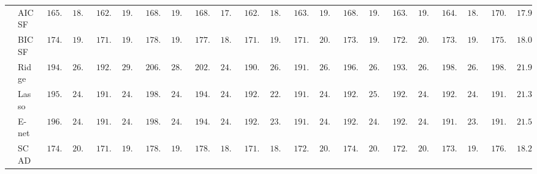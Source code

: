 \begin{tabular}{ll|ll|llllll|llllll|llllll}
 & AIC SF  & $\phantom{0}165.21$ & $\phantom{0}18.66$ & $\phantom{0}162.78$ & $\phantom{0}19.10$ & $\phantom{0}168.74$ & $\phantom{0}19.47$ & $\phantom{0}168.38$ & $\phantom{0}17.49$ & $\phantom{0}162.47$ & $\phantom{0}18.12$ & $\phantom{0}163.61$ & $\phantom{0}19.58$ & $\phantom{0}168.05$ & $\phantom{0}19.37$ & $\phantom{0}163.48$ & $\phantom{0}19.36$ & $\phantom{0}164.74$ & $\phantom{0}18.69$ & $\phantom{0}170.24$ & $\phantom{0}17.98$ \\
 & BIC SF  & $\phantom{0}174.52$ & $\phantom{0}19.76$ & $\phantom{0}171.41$ & $\phantom{0}19.43$ & $\phantom{0}178.00$ & $\phantom{0}19.90$ & $\phantom{0}177.50$ & $\phantom{0}18.52$ & $\phantom{0}171.19$ & $\phantom{0}19.00$ & $\phantom{0}171.84$ & $\phantom{0}20.57$ & $\phantom{0}173.79$ & $\phantom{0}19.88$ & $\phantom{0}172.66$ & $\phantom{0}20.32$ & $\phantom{0}173.35$ & $\phantom{0}19.49$ & $\phantom{0}175.41$ & $\phantom{0}18.00$ \\
 & Ridge  & $\phantom{0}194.20$ & $\phantom{0}26.13$ & $\phantom{0}192.95$ & $\phantom{0}29.05$ & $\phantom{0}206.23$ & $\phantom{0}28.25$ & $\phantom{0}202.09$ & $\phantom{0}24.44$ & $\phantom{0}190.80$ & $\phantom{0}26.24$ & $\phantom{0}191.40$ & $\phantom{0}26.77$ & $\phantom{0}196.86$ & $\phantom{0}26.02$ & $\phantom{0}193.55$ & $\phantom{0}26.57$ & $\phantom{0}198.22$ & $\phantom{0}26.92$ & $\phantom{0}198.40$ & $\phantom{0}21.96$ \\
 & Lasso  & $\phantom{0}195.92$ & $\phantom{0}24.46$ & $\phantom{0}191.32$ & $\phantom{0}24.59$ & $\phantom{0}198.40$ & $\phantom{0}24.14$ & $\phantom{0}194.86$ & $\phantom{0}24.18$ & $\phantom{0}192.12$ & $\phantom{0}22.78$ & $\phantom{0}191.41$ & $\phantom{0}24.67$ & $\phantom{0}192.13$ & $\phantom{0}25.03$ & $\phantom{0}192.91$ & $\phantom{0}24.56$ & $\phantom{0}192.16$ & $\phantom{0}24.09$ & $\phantom{0}191.98$ & $\phantom{0}21.34$ \\
 & E-net  & $\phantom{0}196.19$ & $\phantom{0}24.72$ & $\phantom{0}191.27$ & $\phantom{0}24.82$ & $\phantom{0}198.14$ & $\phantom{0}24.16$ & $\phantom{0}194.25$ & $\phantom{0}24.06$ & $\phantom{0}192.41$ & $\phantom{0}23.00$ & $\phantom{0}191.36$ & $\phantom{0}24.51$ & $\phantom{0}192.22$ & $\phantom{0}24.81$ & $\phantom{0}192.82$ & $\phantom{0}24.61$ & $\phantom{0}191.74$ & $\phantom{0}23.89$ & $\phantom{0}191.87$ & $\phantom{0}21.52$ \\
 & SCAD  & $\phantom{0}174.90$ & $\phantom{0}20.36$ & $\phantom{0}171.31$ & $\phantom{0}19.50$ & $\phantom{0}178.56$ & $\phantom{0}19.75$ & $\phantom{0}178.86$ & $\phantom{0}18.95$ & $\phantom{0}171.50$ & $\phantom{0}18.95$ & $\phantom{0}172.26$ & $\phantom{0}20.93$ & $\phantom{0}174.22$ & $\phantom{0}20.30$ & $\phantom{0}172.90$ & $\phantom{0}20.36$ & $\phantom{0}173.39$ & $\phantom{0}19.46$ & $\phantom{0}176.21$ & $\phantom{0}18.27$ \\

\end{tabular}
